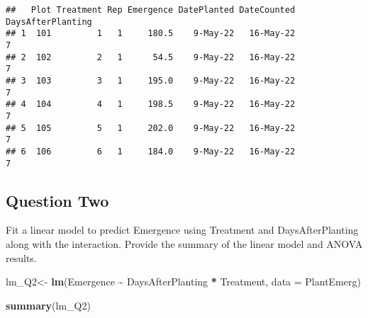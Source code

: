 \documentclass[
  12pt,
]{article}
\newenvironment{Shaded}{\begin{snugshade}}{\end{snugshade}}
\newcommand{\AttributeTok}[1]{\textcolor[rgb]{0.13,0.29,0.53}{#1}}
\newcommand{\FunctionTok}[1]{\textcolor[rgb]{0.13,0.29,0.53}{\textbf{#1}}}
\newcommand{\NormalTok}[1]{#1}
\newcommand{\OtherTok}[1]{\textcolor[rgb]{0.56,0.35,0.01}{#1}}
\newcommand{\SpecialCharTok}[1]{\textcolor[rgb]{0.81,0.36,0.00}{\textbf{#1}}}
\begin{document}
\begin{verbatim}
##   Plot Treatment Rep Emergence DatePlanted DateCounted DaysAfterPlanting
## 1  101         1   1     180.5    9-May-22   16-May-22                 7
## 2  102         2   1      54.5    9-May-22   16-May-22                 7
## 3  103         3   1     195.0    9-May-22   16-May-22                 7
## 4  104         4   1     198.5    9-May-22   16-May-22                 7
## 5  105         5   1     202.0    9-May-22   16-May-22                 7
## 6  106         6   1     184.0    9-May-22   16-May-22                 7
\end{verbatim}

\subsection{Question Two}\label{question-two}

Fit a linear model to predict Emergence using Treatment and
DaysAfterPlanting along with the interaction. Provide the summary of the
linear model and ANOVA results.

\begin{Shaded}
\begin{Highlighting}[]
\NormalTok{lm\_Q2}\OtherTok{\textless{}{-}} \FunctionTok{lm}\NormalTok{(Emergence }\SpecialCharTok{\textasciitilde{}}\NormalTok{ DaysAfterPlanting }\SpecialCharTok{*}\NormalTok{ Treatment, }\AttributeTok{data =}\NormalTok{ PlantEmerg)}

\FunctionTok{summary}\NormalTok{(lm\_Q2)}
\end{Highlighting}
\end{Shaded}
\end{document}
